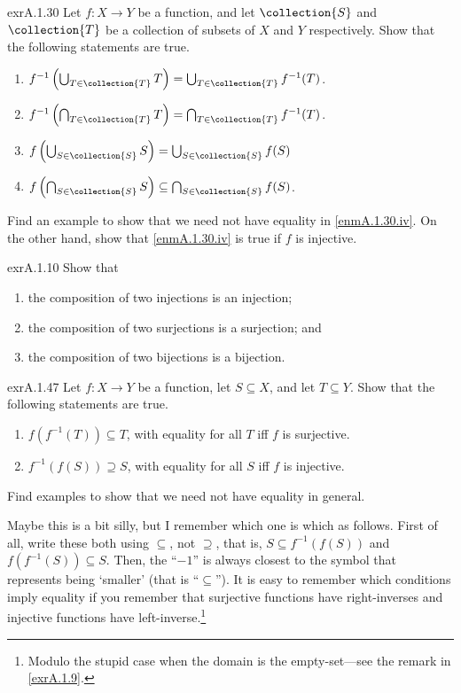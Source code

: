 \begin{exr}{}{exrA.1.30}
Let $f\colon X\rightarrow Y$ be a function, and let $\collection{S}$ and $\collection{T}$ be a collection of subsets of $X$ and $Y$ respectively.  Show that the following statements are true.
\begin{enumerate}
\item \label{enmA.1.30.i}$f^{-1}\left( \bigcup _{T\in \collection{T}}T\right) =\bigcup _{T\in \collection{T}}f^{-1}(T)$.
\item \label{enmA.1.30.ii}$f^{-1}\left( \bigcap _{T\in \collection{T}}T\right) =\bigcap _{T\in \collection{T}}f^{-1}(T)$.
\item \label{enmA.1.30.iii}$f\left( \bigcup _{S\in \collection{S}}S\right) =\bigcup _{S\in \collection{S}}f(S)$
\item \label{enmA.1.30.iv}$f\left( \bigcap _{S\in \collection{S}}S\right) \subseteq \bigcap _{S\in \collection{S}}f(S)$.
\end{enumerate}
Find an example to show that we need not have equality in \cref{enmA.1.30.iv}.  On the other hand, show that \cref{enmA.1.30.iv} is true if $f$ is injective.
\end{exr}
\begin{exr}{}{exrA.1.10}
Show that
\begin{enumerate}
\item the composition of two injections is an injection;
\item the composition of two surjections is a surjection; and
\item the composition of two bijections is a bijection.
\end{enumerate}
\end{exr}
\begin{exr}{}{exrA.1.47}
Let $f\colon X\rightarrow Y$ be a function, let $S\subseteq X$, and let $T\subseteq Y$.  Show that the following statements are true.
\begin{enumerate}
\item \label{enmA.1.47.i}$f\left( f^{-1}(T)\right) \subseteq T$, with equality for all $T$ iff $f$ is surjective.
\item \label{enmA.1.47.ii}$f^{-1}\left( f(S)\right) \supseteq S$, with equality for all $S$ iff $f$ is injective.
\end{enumerate}
Find examples to show that we need not have equality in general.
\begin{rmk}
Maybe this is a bit silly, but I remember which one is which as follows.  First of all, write these both using $\subseteq$, not $\supseteq$, that is, $S\subseteq f^{-1}(f(S))$ and $f(f^{-1}(S))\subseteq S$.  Then, the ``$-1$'' is always closest to the symbol that represents being `smaller' (that is ``$\subseteq$'').  It is easy to remember which conditions imply equality if you remember that surjective functions have right-inverses and injective functions have left-inverse.\footnote{Modulo the stupid case when the domain is the empty-set---see the remark in \cref{exrA.1.9}.}
\end{rmk}
\end{exr}
